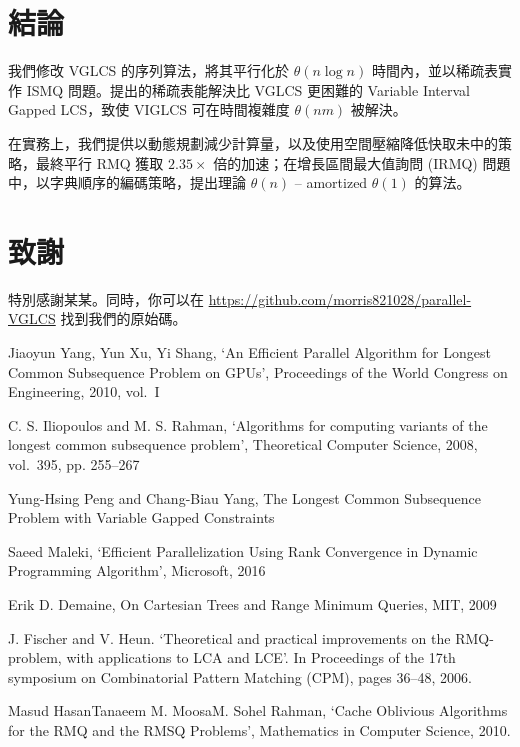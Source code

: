 \documentclass{gapd}
\begin{document}
\section{結論}
\label{sec:Conclusion}

我們修改 VGLCS 的序列算法，將其平行化於 $\theta(n \log n)$ 時間內，並以稀疏表實作 ISMQ 問題。提出的稀疏表能解決比 VGLCS 更困難的 Variable Interval Gapped LCS，致使 VIGLCS 可在時間複雜度 $\theta(nm)$ 被解決。

在實務上，我們提供以動態規劃減少計算量，以及使用空間壓縮降低快取未中的策略，最終平行 RMQ 獲取 $2.35 \times$ 倍的加速；在增長區間最大值詢問 (IRMQ) 問題中，以字典順序的編碼策略，提出理論 $\theta(n)$ -- amortized $\theta(1)$  的算法。

\section*{致謝}

特別感謝某某。同時，你可以在 \url{https://github.com/morris821028/parallel-VGLCS} 找到我們的原始碼。

\begin{thebibliography}{4}

 Jiaoyun Yang, Yun Xu, Yi Shang, `An Efficient Parallel Algorithm for Longest Common Subsequence Problem on GPUs', Proceedings of the World Congress on Engineering, 2010, vol.~I 

 C. S. Iliopoulos and M. S. Rahman, `Algorithms for computing variants of the longest common subsequence problem', Theoretical Computer Science, 2008, vol.~395, pp. 255--267

 Yung-Hsing Peng and Chang-Biau Yang, The Longest Common Subsequence Problem with Variable Gapped Constraints

 Saeed Maleki, `Efficient Parallelization Using Rank Convergence in Dynamic Programming Algorithm', Microsoft, 2016

 Erik D. Demaine, On Cartesian Trees and Range Minimum Queries, MIT, 2009

 J. Fischer and V. Heun. `Theoretical and practical improvements on the RMQ-problem, with applications to LCA and LCE'. In Proceedings of the 17th symposium on Combinatorial Pattern Matching (CPM), pages 36–48, 2006.

 Masud HasanTanaeem M. MoosaM. Sohel Rahman, `Cache Oblivious Algorithms for the RMQ and the RMSQ Problems', Mathematics in Computer Science, 2010.

\end{thebibliography}
\end{document}
